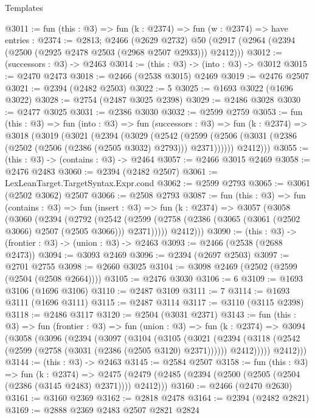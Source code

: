 \begin{lexlean}{Templates}
\begin{coremodule}
@3011 := fun (this : @3) =>
  fun (k : @2374) =>
  fun (w : @2374) =>
  have entries : @2374 := @2813;
  @2466
    (@2629 @2732)
    @50
    (@2917 (@2964 (@2394 (@2500 (@2925 @2478 @2503 (@2968 @2507 @2933))) @2412)))
@3012 := (successors : @3) -> @2463
@3014 := (this : @3) -> (into : @3) -> @3012
@3015 := @2470 @2473
@3018 := @2466 (@2538 @3015) @2469
@3019 := @2476 @2507
@3021 := @2394 (@2482 @2503)
@3022 := 5
@3025 := @1693 @3022 (@1696 @3022)
@3028 := @2754 (@2487 @3025 @2398)
@3029 := @2486 @3028
@3030 := @2477 @3025
@3031 := @2386 @3030
@3032 := @2599 @2759
@3053 := fun (this : @3) =>
  fun (into : @3) =>
  fun (successors : @3) =>
  fun (k : @2374) =>
  @3018
    (@3019
      (@3021
        (@2394
          (@3029
            (@2542
              (@2599 (@2506 (@3031 (@2386 (@2502 (@2506 (@2386 (@2505 @3032) @2793))) @2371))))))
          @2412)))
@3055 := (this : @3) -> (contains : @3) -> @2464
@3057 := @2466 @3015 @2469
@3058 := @2476 @2483
@3060 := @2394 (@2482 @2507)
@3061 := LexLeanTarget.TargetSyntax.Expr.cond
@3062 := @2599 @2793
@3065 := @3061 (@2502 @3062) @2507
@3066 := @2508 @2793
@3087 := fun (this : @3) =>
  fun (contains : @3) =>
  fun (insert : @3) =>
  fun (k : @2374) =>
  @3057
    (@3058
      (@3060
        (@2394
          (@2792
            (@2542 (@2599 (@2758 (@2386 (@3065 (@3061 (@2502 @3066) @2507 (@2505 @3066))) @2371)))))
          @2412)))
@3090 := (this : @3) -> (frontier : @3) -> (union : @3) -> @2463
@3093 := @2466 (@2538 (@2688 @2473))
@3094 := @3093 @2469
@3096 := @2394 (@2697 @2503)
@3097 := @2701 @2755
@3098 := @2660 @3025
@3104 := @3098 @2469 (@2502 (@2599 (@2504 (@2508 @2664))))
@3105 := @2476 @3030
@3106 := 6
@3109 := @1693 @3106 (@1696 @3106)
@3110 := @2487 @3109
@3111 := 7
@3114 := @1693 @3111 (@1696 @3111)
@3115 := @2487 @3114
@3117 := @3110 (@3115 @2398)
@3118 := @2486 @3117
@3120 := @2504 (@3031 @2371)
@3143 := fun (this : @3) =>
  fun (frontier : @3) =>
  fun (union : @3) =>
  fun (k : @2374) =>
  @3094
    (@3058
      (@3096
        (@2394
          (@3097
            (@3104
              (@3105
                (@3021
                  (@2394
                    (@3118 (@2542 (@2599 (@2758 (@3031 (@2386 (@2505 @3120) @2371))))))
                    @2412)))))
          @2412)))
@3144 := (this : @3) -> @2463
@3145 := @2584 @2507
@3158 := fun (this : @3) =>
  fun (k : @2374) =>
  @2475 (@2479 (@2485 (@2394 (@2500 (@2505 (@2504 (@2386 (@3145 @2483) @2371)))) @2412)))
@3160 := @2466 (@2470 @2630)
@3161 := @3160 @2369
@3162 := @2818 @2478
@3164 := @2394 (@2482 @2821)
@3169 := @2888 @2369 @2483 @2507 @2821 @2824

\end{coremodule}
\end{lexlean}
